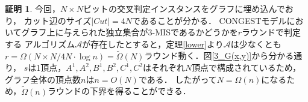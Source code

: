 \documentclass[12pt]{thesis}
\newcommand{\Izumi}[1]{\textcolor{blue}{(#1)}}
\newcommand{\CONGEST}{\textsf{CONGEST}}
\theoremstyle{definition}
\newtheorem*{prf*}{証明}
\begin{document}
\begin{prf*}
今回，$N \times N$ビットの交叉判定インスタンスをグラフに埋め込んでおり，
カット辺のサイズ$|Cut| = 4N$であることが分かる．
{\CONGEST}モデルにおいてグラフ上に与えられた独立集合が3-MISであるかどうかを$r$ラウンドで判定する
アルゴリズム$\mathcal{A}$が存在したとすると，定理\ref{lower}より$\mathcal{A}$は少なくとも
$r = \Omega (N \times N/ 4N \cdot \log n) = \tilde{\Omega}(N)$ラウンド動く．図\ref{3_G(x,y)}から分かる通り，
$s$は1頂点，$A^{1}, A^{2}, B^{1}, B^{2}, C^{1}, C^{2}$はそれぞれ$N$頂点で構成されているため，
グラフ全体の頂点数$n$は$n = O(N)$である．
したがって$N = \Omega(n)$になるため，$\tilde{\Omega}(n)$ラウンドの下界を得ることができる．

\end{prf*}
\end{document}
